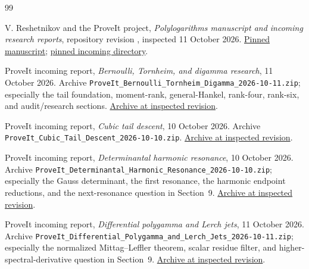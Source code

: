 \begin{thebibliography}{99}
\raggedright
{}

V. Reshetnikov and the ProveIt project,
\emph{Polylogarithms manuscript and incoming research reports},
repository revision \repoSHA, inspected 11 October 2026.
\href{https://github.com/VladimirReshetnikov/ProveIt/tree/446dca9bd65c20e409d1d2561d4ffad408103e2a/Analysis/Polylogarithms/docs/manuscript}{Pinned manuscript};
\href{https://github.com/VladimirReshetnikov/ProveIt/tree/446dca9bd65c20e409d1d2561d4ffad408103e2a/docs/incoming}{pinned incoming directory}.

ProveIt incoming report,
\emph{Bernoulli, Tornheim, and digamma research}, 11 October 2026.
Archive \texttt{ProveIt\_Bernoulli\_Tornheim\_Digamma\_2026-10-11.zip};
especially the tail foundation, moment-rank, general-Hankel,
rank-four, rank-six, and audit/research sections.
\href{https://github.com/VladimirReshetnikov/ProveIt/blob/446dca9bd65c20e409d1d2561d4ffad408103e2a/docs/incoming/ProveIt_Bernoulli_Tornheim_Digamma_2026-10-11.zip}{Archive at inspected revision}.

ProveIt incoming report,
\emph{Cubic tail descent}, 10 October 2026.
Archive \texttt{ProveIt\_Cubic\_Tail\_Descent\_2026-10-10.zip}.
\href{https://github.com/VladimirReshetnikov/ProveIt/blob/446dca9bd65c20e409d1d2561d4ffad408103e2a/docs/incoming/ProveIt_Cubic_Tail_Descent_2026-10-10.zip}{Archive at inspected revision}.

ProveIt incoming report,
\emph{Determinantal harmonic resonance}, 10 October 2026.
Archive \texttt{ProveIt\_Determinantal\_Harmonic\_Resonance\_2026-10-10.zip};
especially the Gauss determinant, the first resonance, the harmonic
endpoint reductions, and the next-resonance question in Section~9.
\href{https://github.com/VladimirReshetnikov/ProveIt/blob/446dca9bd65c20e409d1d2561d4ffad408103e2a/docs/incoming/ProveIt_Determinantal_Harmonic_Resonance_2026-10-10.zip}{Archive at inspected revision}.

ProveIt incoming report,
\emph{Differential polygamma and Lerch jets}, 11 October 2026.
Archive \texttt{ProveIt\_Differential\_Polygamma\_and\_Lerch\_Jets\_2026-10-11.zip};
especially the normalized Mittag--Leffler theorem, scalar residue
filter, and higher-spectral-derivative question in Section~9.
\href{https://github.com/VladimirReshetnikov/ProveIt/blob/446dca9bd65c20e409d1d2561d4ffad408103e2a/docs/incoming/ProveIt_Differential_Polygamma_and_Lerch_Jets_2026-10-11.zip}{Archive at inspected revision}.


\end{thebibliography}
